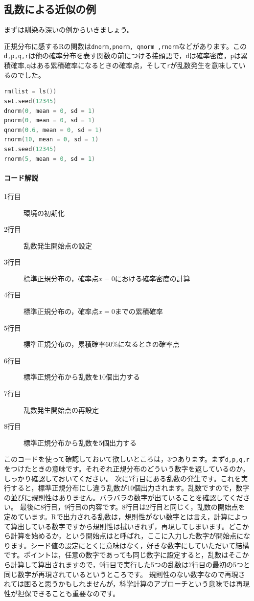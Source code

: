 \documentclass{ltjsbook}
\begin{document}
\subsection{乱数による近似の例}
まずは馴染み深いの例からいきましょう。

正規分布に感するRの関数は\texttt{dnorm,pnorm, qnorm ,rnorm}などがあります。この\texttt{d,p,q,r}は他の確率分布を表す関数の前につける接頭語で，\texttt{d}は確率密度，\texttt{p}は累積確率,\texttt{q}はある累積確率になるときの確率点，そして\texttt{r}が乱数発生を意味しているのでした。

\begin{lstlisting}[language=c++,label={code:17_01},caption={乱数のコードの例}]
rm(list = ls())
set.seed(12345)
dnorm(0, mean = 0, sd = 1)
pnorm(0, mean = 0, sd = 1)
qnorm(0.6, mean = 0, sd = 1)
rnorm(10, mean = 0, sd = 1)
set.seed(12345)
rnorm(5, mean = 0, sd = 1)
\end{lstlisting}
\paragraph{コード解説}
\begin{description}
	\item[1行目] 環境の初期化
	\item[2行目] 乱数発生開始点の設定
	\item[3行目] 標準正規分布の，確率点$x=0$における確率密度の計算
	\item[4行目] 標準正規分布の，確率点$x=0$までの累積確率
	\item[5行目] 標準正規分布の，累積確率60\%になるときの確率点
	\item[6行目] 標準正規分布から乱数を10個出力する
	\item[7行目] 乱数発生開始点の再設定
	\item[8行目] 標準正規分布から乱数を5個出力する
\end{description}

このコードを使って確認しておいて欲しいところは，3つあります。まず\texttt{d,p,q,r}をつけたときの意味です。それぞれ正規分布のどういう数字を返しているのか，しっかり確認しておいてください。
次に7行目にある乱数の発生です。これを実行すると，標準正規分布にし違う乱数が10個出力されます。乱数ですので，数字の並びに規則性はありません。バラバラの数字が出ていることを確認してください。
最後に8行目，9行目の内容です。8行目は2行目と同じく，乱数の開始点を定めています。Rで出力される乱数は，規則性がない数字とは言え，計算によって算出している数字ですから規則性は拭いきれず，再現してしまいます。どこから計算を始めるか，という開始点はと呼ばれ，ここに入力した数字が開始点になります。シード値の設定にとくに意味はなく，好きな数字にしていただいて結構です。ポイントは，任意の数字であっても同じ数字に設定すると，乱数はそこから計算して算出されますので，9行目で実行した5つの乱数は7行目の最初の5つと同じ数字が再現されているというところです。
規則性のない数字なので再現されては困ると思うかもしれませんが，科学計算のアプローチという意味では再現性が担保できることも重要なのです。
\end{document}
